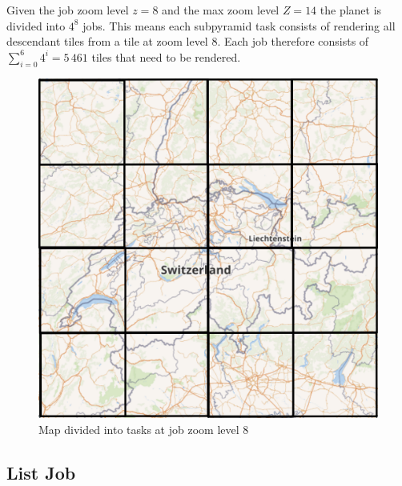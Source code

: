 \noindent\begin{minipage}[t]{0.48\linewidth}
    \vspace{0pt}
    Given the job zoom level $z=8$ and the max zoom level $Z=14$ the planet is divided into $4^{8}$ jobs.
    This means each subpyramid task consists of rendering all descendant tiles from a tile at zoom level 8.
    Each job therefore consists of $\sum_{i=0}^{6} 4^i = 5\,461$ tiles that need to be rendered.  \\
\end{minipage}
\hfill
\begin{minipage}[t]{0.48\linewidth}
    \vspace{-10pt}
    \begin{figure}[H]
      \centering
      \includegraphics[width=\textwidth]{images/switzerland_tiled_z8_small.png}
      \caption{Map divided into tasks at job zoom level 8}
    \end{figure}
\end{minipage}

\subsection{List Job}\label{list-job}

